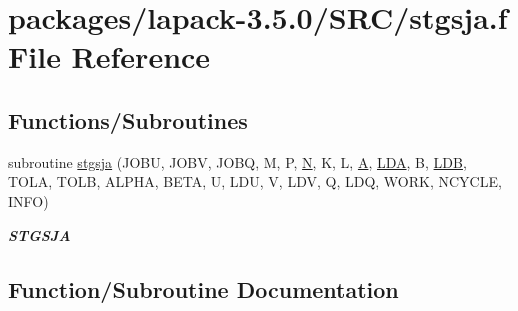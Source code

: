 \hypertarget{stgsja_8f}{}\section{packages/lapack-\/3.5.0/\+S\+R\+C/stgsja.f File Reference}
\label{stgsja_8f}
\subsection*{Functions/\+Subroutines}
\begin{DoxyCompactItemize}
\item 
subroutine \hyperlink{stgsja_8f_a07e8399b7313ad78db4e44d119365c6b}{stgsja} (J\+O\+B\+U, J\+O\+B\+V, J\+O\+B\+Q, M, P, \hyperlink{polmisc_8c_a0240ac851181b84ac374872dc5434ee4}{N}, K, L, \hyperlink{classA}{A}, \hyperlink{example__user_8c_ae946da542ce0db94dced19b2ecefd1aa}{L\+D\+A}, B, \hyperlink{example__user_8c_a50e90a7104df172b5a89a06c47fcca04}{L\+D\+B}, T\+O\+L\+A, T\+O\+L\+B, A\+L\+P\+H\+A, B\+E\+T\+A, U, L\+D\+U, V, L\+D\+V, Q, L\+D\+Q, W\+O\+R\+K, N\+C\+Y\+C\+L\+E, I\+N\+F\+O)
\begin{DoxyCompactList}\small\item\em {\bfseries S\+T\+G\+S\+J\+A} \end{DoxyCompactList}\end{DoxyCompactItemize}


\subsection{Function/\+Subroutine Documentation}
\hypertarget{stgsja_8f_a07e8399b7313ad78db4e44d119365c6b}{}
